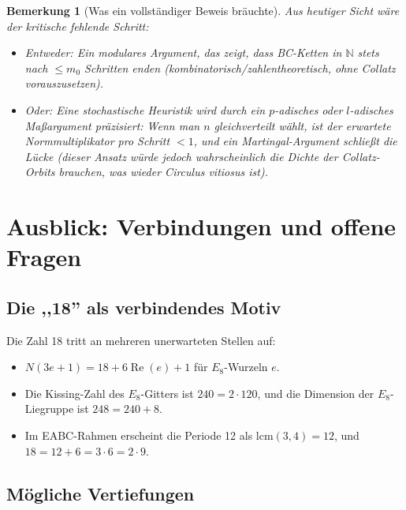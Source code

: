 \documentclass[12pt,a4paper]{article}
\newtheorem{bemerkung}[definition]{Bemerkung}
\newcommand{\Norm}[1]{N(#1)}       %
\renewcommand{\Re}{\operatorname{Re}}
\newcommand{\N}{\mathbb{N}}
\begin{document}
\begin{bemerkung}[Was ein vollständiger Beweis bräuchte]
Aus heutiger Sicht wäre der kritische fehlende Schritt:
\begin{itemize}
  \item Entweder: Ein modulares Argument, das zeigt, dass
    BC-Ketten in $\N$ stets nach $\leq m_0$ Schritten enden
    (kombinatorisch/zahlentheoretisch, ohne Collatz vorauszusetzen).
  \item Oder: Eine stochastische Heuristik wird durch ein $p$-adisches
    oder $l$-adisches Maßargument präzisiert: Wenn man $n$ gleichverteilt
    wählt, ist der erwartete Normmultiplikator pro Schritt $< 1$,
    und ein Martingal-Argument schließt die Lücke
    (dieser Ansatz würde jedoch wahrscheinlich die
    Dichte der Collatz-Orbits brauchen, was wieder Circulus vitiosus ist).
\end{itemize}
\end{bemerkung}

\section{Ausblick: Verbindungen und offene Fragen}

\subsection{Die \texorpdfstring{,,18''}{18} als verbindendes Motiv}

Die Zahl 18 tritt an mehreren unerwarteten Stellen auf:
\begin{itemize}
  \item $\Norm{3e+1} = 18 + 6\Re(e) + 1$ für $E_8$-Wurzeln $e$.
  \item Die Kissing-Zahl des $E_8$-Gitters ist $240 = 2 \cdot 120$,
    und die Dimension der $E_8$-Liegruppe ist $248 = 240 + 8$.
  \item Im EABC-Rahmen erscheint die Periode 12 als $\text{lcm}(3,4) = 12$,
    und $18 = 12 + 6 = 3 \cdot 6 = 2 \cdot 9$.
\end{itemize}

\subsection{Mögliche Vertiefungen}
\end{document}

